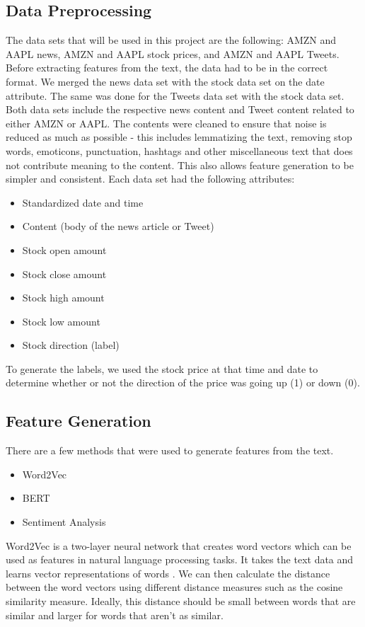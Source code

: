 \documentclass[conference]{IEEEtran}
\begin{document}
\subsection{Data Preprocessing}\label{AA}
The data sets that will be used in this project are the following: AMZN and AAPL news, AMZN and AAPL stock prices, and AMZN and AAPL Tweets. Before extracting features from the text, the data had to be in the correct format. We merged the news data set with the stock data set on the date attribute. The same was done for the Tweets data set with the stock data set. Both data sets include the respective news content and Tweet content related to either AMZN or AAPL. The contents were cleaned to ensure that noise is reduced as much as possible - this includes lemmatizing the text, removing stop words, emoticons, punctuation, hashtags and other miscellaneous text that does not contribute meaning to the content. This also allows feature generation to be simpler and consistent. Each data set had the following attributes:
\begin{itemize}
    \item Standardized date and time
    \item Content (body of the news article or Tweet)
    \item Stock open amount
    \item Stock close amount
    \item Stock high amount
    \item Stock low amount
    \item Stock direction (label)
\end{itemize}
To generate the labels, we used the stock price at that time and date to determine whether or not the direction of the price was going up (1) or down (0).

\subsection{Feature Generation}
There are a few methods that were used to generate features from the text.
\begin{itemize}
    \item Word2Vec
    \item BERT
    \item Sentiment Analysis
\end{itemize}

Word2Vec is a two-layer neural network that creates word vectors which can be used as features in natural language processing tasks. It takes the text data and learns vector representations of words \cite{b3}. We can then calculate the distance between the word vectors using different distance measures such as the cosine similarity measure. Ideally, this distance should be small between words that are similar and larger for words that aren't as similar.
\end{document}
